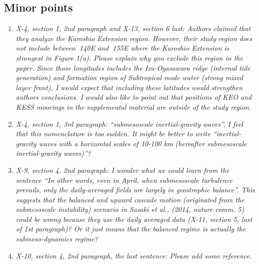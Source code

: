 \documentclass[11pt]{article}
\begin{document}
\subsection{Minor points}

\begin{enumerate}

  \item {\it X-4, section 1, 2nd paragraph and X-13, section 6 last: Authors claimed that they
        analyze the Kuroshio Extension region. However, their study region does not
        include between $~$140E and $~$155E where the Kuroshio Extension is strongest in
        Figure 1(a). Please explain why you exclude this region in the paper. Since those
        longitudes includes the Izu-Ogasawara ridge (internal tide generation) and
        formation region of Subtropical mode water (strong mixed layer front), I would
        expect that including these latitudes would strengthen authors conclusions. I
        would also like to point out that positions of KEO and KESS moorings in the
        supplemental material are outside of the study region.}

  \item {\it X-4, section 1, 3rd paragraph: “submesoscale inertial-gravity waves”. I feel that this
        nomenclature is too sudden. It might be better to write “inertial-gravity waves
        with a horizontal scales of 10-100 km (hereafter submesoscale inertial-gravity
        waves)”?}

  \item {\it X-9, section 4, 2nd paragraph: I wonder what we could learn from the sentence “In
          other words, even in April, when submesoscale turbulence prevails, only the
          daily-averaged fields are largely in geostrophic balance”. This suggests that the
          balanced and upward cascade motion (originated from the submesoscale
          instability) scenario in Sasaki et al., (2014, nature comm. 5) could be wrong
          because they use the daily averaged data (X-11, section 5, last of 1st paragraph)?
          Or it just means that the balanced regime is actually the submeso-dynamics
          regime?}

  \item {\it X-10, section 4, 2nd paragraph, the last sentence: Please add some reference.}

\end{enumerate}
\end{document}
